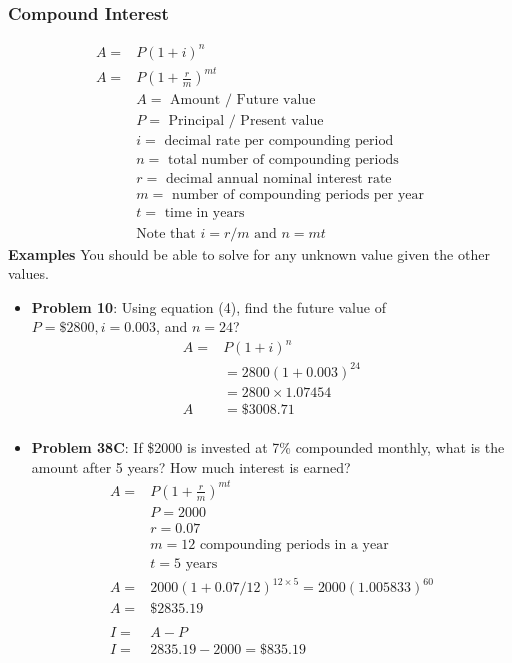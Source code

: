 \documentclass[14pt]{extarticle}
\begin{document}
\subsubsection*{Compound Interest}
\begin{align*}
	A = &P(1+i)^n \tag{4} \\
	A = &P\left(1+\frac{r}{m}\right)^{mt} \tag{5} \\
	&A = \text{ Amount / Future value} \\
	&P = \text{ Principal / Present value} \\
	&i = \text{ decimal rate per compounding period} \\
	&n = \text{ total number of compounding periods} \\
	&r = \text{ decimal annual nominal interest rate} \\
	&m = \text{ number of compounding periods per year} \\
	&t = \text{ time in years} \\
	&\text{Note that } i=r/m \text{ and } n= mt
\end{align*}
\textbf{Examples}
You should be able to solve for any unknown value given the other values.
\begin{itemize}
	\item \textbf{Problem 10}: Using equation (4), find the future value of $P=\$2800, i=0.003$, and $n=24$?
	\begin{align*}
		A = &P(1+i)^n \\
		&= 2800(1+0.003)^{24} \\
		&= 2800 \times 1.07454 \\
		A &= \$3008.71 \\
	\end{align*}
	\item \textbf{Problem 38C}: If \$2000 is invested at 7\% compounded monthly, what is the amount after 5 years? How much interest is earned?
	\begin{align*}
		A = &P\left(1+\frac{r}{m}\right)^{mt} \\
		&P =2000 \\
		&r = 0.07 \\
		&m = 12 \text{ compounding periods in a year} \\
		&t = 5 \text{ years} \\
		A = &2000(1+0.07/12)^{12 \times 5} 	= 2000(1.005833)^{60} \\
		A = &\$2835.19 \\\\
		I = &A-P \\
		I = &2835.19 - 2000 = \$835.19
	\end{align*}
\end{itemize}
\end{document}
